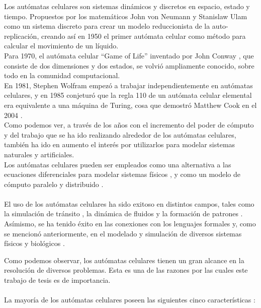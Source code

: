 Los autómatas celulares son sistemas dinámicos y discretos en espacio, estado y tiempo. Propuestos por los matemáticos John von Neumann y Stanislaw Ulam como un sistema discreto para crear un modelo reduccionista de la auto-replicación, creando así en 1950 el primer autómata celular como método para calcular el movimiento de un líquido. 
\\
Para 1970, el autómata celular “Game of Life” inventado por John Conway \citep{gardner1970mathematical}, que consiste de dos dimensiones y dos estados, se volvió ampliamente conocido, sobre todo en la comunidad computacional.
\\
En 1981, Stephen Wolfram empezó a trabajar independientemente en autómatas celulares, y en 1985 conjeturó que la regla 110 de un autómata celular elemental era equivalente a una máquina de Turing, cosa que demostró Matthew Cook en el 2004 \citep{cook2004universality}.
\\
Como podemos ver, a través de los años con el incremento del poder de cómputo y del trabajo que se ha ido realizando alrededor de los autómatas celulares, también ha ido en aumento el interés por utilizarlos para modelar sistemas naturales y artificiales.
\\
Los autómatas celulares pueden ser empleados como una alternativa a las ecuaciones diferenciales para modelar sistemas físicos \citep{toffoli1984cellular}, y como un modelo de cómputo paralelo y distribuido \citep{hillis1984connection}.
\\
\\
El uso de los autómatas celulares ha sido exitoso en distintos campos, tales como la simulación de tránsito \citep{simon1998simplified}, la dinámica de fluidos  \citep{margolus1986cellular} y la formación de patrones \citep{tamayo1987cellular,boerlijstk}. Asímismo, se ha tenido éxito en las conexiones con los lenguajes formales \citep{nordahl1989formal,culik1990computation} y, como se mencionó anteriormente, en el modelado y simulación de diversos sistemas físicos \citep{vichniac1984simulating,manneville2012cellular} y biológicos \citep{ermentrout1993cellular}.

Como podemos observar, los autómatas celulares tienen un gran alcance en la resolución de diversos problemas. Esta es una de las razones por las cuales este trabajo de tesis es de importancia.
\\
\\
La mayoría de los autómatas celulares poseen las siguientes cinco características \citep{ilachinski2001cellular}:

